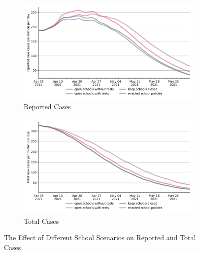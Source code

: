 \begin{figure}[ht] %
  \centering
  \begin{subfigure}[b]{.49\textwidth}
    \centering
    \includegraphics[width=0.9 \textwidth]{figures/results/figures/scenario_comparisons/school_scenarios/full_new_known_case}
    \caption{Reported Cases}
    \label{fig:school_scenarios_new_known_case}
  \end{subfigure}%
  \hfill
  \begin{subfigure}[b]{.49\textwidth}
    \centering
    \includegraphics[width=0.9 \textwidth]{figures/results/figures/scenario_comparisons/school_scenarios/full_newly_infected}
    \caption{Total Cases}
    \label{fig:school_scenarios_newly_infected}
  \end{subfigure}
  \caption{The Effect of Different School Scenarios on Reported and Total Cases}
  \label{fig:school_scenarios_detailed}
\end{figure}
